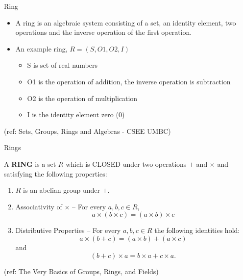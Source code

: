 \begin{frame}{Ring}

\begin{itemize}
\item A ring is an algebraic system consisting of a set, an identity element,
  two operations and the inverse operation of the first operation.
\item An example ring, $R = ( S, O1, O2, I )$
\begin{itemize}
\item S is set of real numbers
\item  O1 is the operation of addition, the inverse operation is subtraction
\item O2 is the operation of multiplication
\item I is the identity element zero (0)
\end{itemize}
\end{itemize}


\tiny{(ref: Sets, Groups, Rings and Algebras - CSEE UMBC)}

\end{frame}

\begin{frame}{Rings}

\begin{Definition} A {\bf RING} is a set $R$ which is CLOSED under two operations $+$ and $\times$ and satisfying the following properties:
\begin{enumerate}
\item $R$ is an abelian group under $+$.
\item Associativity of $\times$ -- For every $a,b,c \in R$,
$$ a \times (b \times c) = (a \times b) \times c $$
\item Distributive Properties -- For every $a,b,c \in R$ the following identities hold:
$$ a \times (b + c) = (a \times b) + (a \times c) $$
and
$$ (b + c) \times a = b \times a + c \times a. $$
\end{enumerate}
\end{Definition}




\tiny{(ref: The Very Basics of Groups, Rings, and Fields)}

\end{frame}

